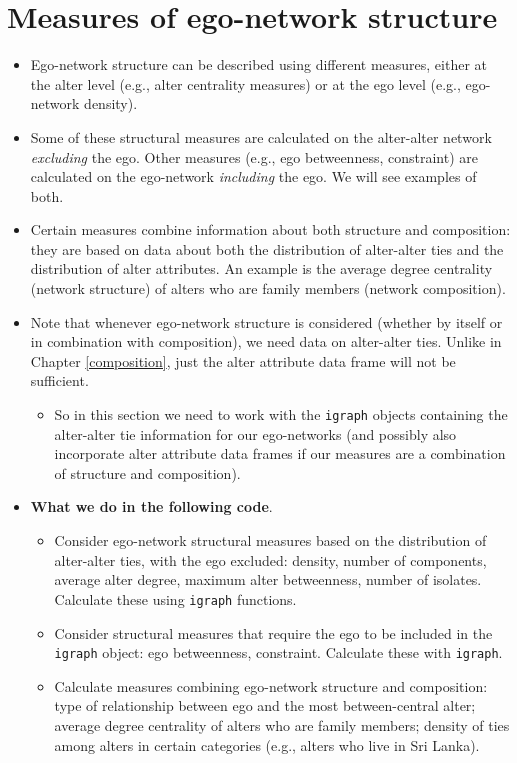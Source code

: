 \documentclass[
]{book}
\providecommand{\tightlist}{%
  \setlength{\itemsep}{0pt}\setlength{\parskip}{0pt}}
\begin{document}
\hypertarget{measures-of-ego-network-structure}{%
\section{Measures of ego-network structure}\label{measures-of-ego-network-structure}}

\begin{itemize}
\tightlist
\item
  Ego-network structure can be described using different measures, either at the alter level (e.g., alter centrality measures) or at the ego level (e.g., ego-network density).
\item
  Some of these structural measures are calculated on the alter-alter network \emph{excluding} the ego. Other measures (e.g., ego betweenness, constraint) are calculated on the ego-network \emph{including} the ego. We will see examples of both.
\item
  Certain measures combine information about both structure and composition: they are based on data about both the distribution of alter-alter ties and the distribution of alter attributes. An example is the average degree centrality (network structure) of alters who are family members (network composition).
\item
  Note that whenever ego-network structure is considered (whether by itself or in combination with composition), we need data on alter-alter ties. Unlike in Chapter \ref{composition}, just the alter attribute data frame will not be sufficient.

  \begin{itemize}
  \tightlist
  \item
    So in this section we need to work with the \texttt{igraph} objects containing the alter-alter tie information for our ego-networks (and possibly also incorporate alter attribute data frames if our measures are a combination of structure and composition).
  \end{itemize}
\item
  \textbf{What we do in the following code}.

  \begin{itemize}
  \tightlist
  \item
    Consider ego-network structural measures based on the distribution of alter-alter ties, with the ego excluded: density, number of components, average alter degree, maximum alter betweenness, number of isolates. Calculate these using \texttt{igraph} functions.
  \item
    Consider structural measures that require the ego to be included in the \texttt{igraph} object: ego betweenness, constraint. Calculate these with \texttt{igraph}.
  \item
    Calculate measures combining ego-network structure and composition: type of relationship between ego and the most between-central alter; average degree centrality of alters who are family members; density of ties among alters in certain categories (e.g., alters who live in Sri Lanka).
  \end{itemize}
\end{itemize}
\end{document}

